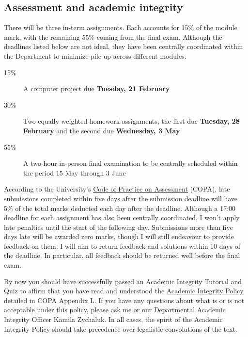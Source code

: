 \subsection*{Assessment and academic integrity}
There will be three in-term assignments.
Each accounts for 15\% of the module mark, with the remaining 55\% coming from the final exam.
Although the deadlines listed below are not ideal, they have been centrally coordinated within the Department to minimize pile-up across different modules.
\begin{description}
  \item[15\%] A computer project due \textbf{Tuesday, 21 February}
  \item[30\%] Two equally weighted homework assignments, the first due \textbf{Tuesday, 28 February} and the second due \textbf{Wednesday, 3 May}
  \item[55\%] A two-hour in-person final examination to be centrally scheduled within the period 15 May through 3 June
\end{description}

According to the University's \href{https://www.liverpool.ac.uk/media/livacuk/tqsd/code-of-practice-on-assessment/code_of_practice_on_assessment.pdf}{Code of Practice on Assessment} (COPA), late submissions completed within five days after the submission deadline will have 5\% of the total marks deducted each day after the deadline. %
Although a 17:00 deadline for each assignment has also been centrally coordinated, I won't apply late penalties until the start of the following day.
Submissions more than five days late will be awarded zero marks, though I will still endeavour to provide feedback on them.
I will aim to return feedback and solutions within 10 days of the deadline.
In particular, all feedback should be returned well before the final exam.

By now you should have successfully passed an Academic Integrity Tutorial and Quiz to affirm that you have read and understood the \href{https://www.liverpool.ac.uk/media/livacuk/tqsd/code-of-practice-on-assessment/appendix_L_cop_assess.pdf}{Academic Integrity Policy} detailed in COPA Appendix L.
If you have any questions about what is or is not acceptable under this policy, please ask me or our Departmental Academic Integrity Officer Kamila Zychaluk.
In all cases, the spirit of the Academic Integrity Policy should take precedence over legalistic convolutions of the text.

